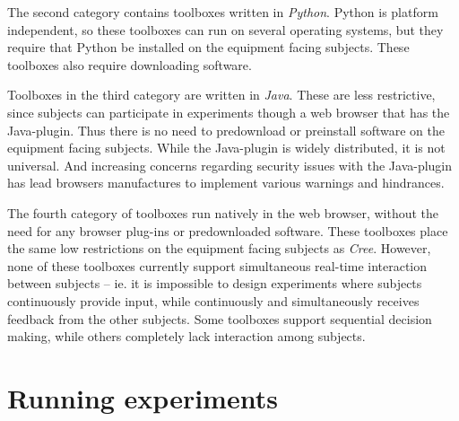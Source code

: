 \documentclass[preprint, 12pt]{elsarticle}
\newcommand{\Cree}{\emph{Cree}\xspace}
\begin{document}
The second category contains toolboxes written in \emph{Python}. Python is platform independent, so these toolboxes can run on several operating systems, but they require that Python be installed on the equipment facing subjects\footnotemark[2]. These toolboxes also require downloading software.


Toolboxes in the third category are written in \emph{Java}. These are less restrictive, since subjects can participate in experiments though a web browser that has the Java-plugin. Thus there is no need to predownload or preinstall software on the equipment facing subjects. While the Java-plugin is widely distributed, it is not universal\footnotemark[3]. And increasing concerns regarding security issues with the Java-plugin has lead browsers manufactures to implement various warnings and hindrances\footnotemark[4]. 

 

The fourth category of toolboxes run natively in the web browser, without the need for any browser plug-ins or predownloaded software. These toolboxes place the same low restrictions on the equipment facing subjects as \Cree. However, none of these toolboxes currently support simultaneous real-time interaction between subjects -- ie. it is impossible to design experiments where subjects continuously provide input, while continuously and simultaneously receives feedback from the other subjects. Some toolboxes support sequential decision making, while others completely lack interaction among subjects.


\section{Running experiments}
\label{S:Running}
\end{document}
